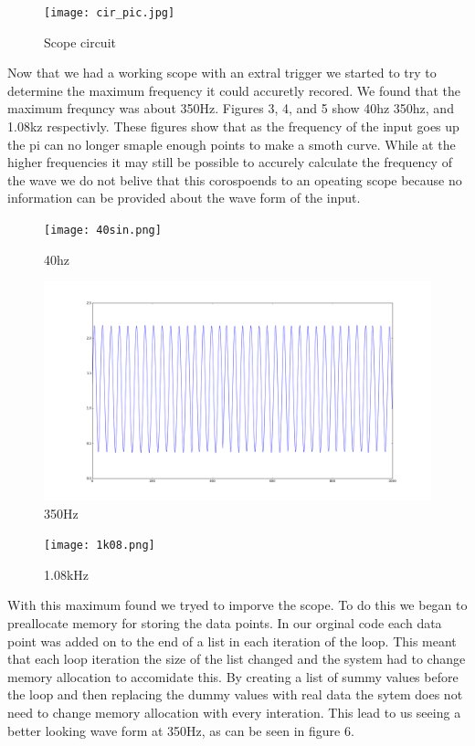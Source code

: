 \documentclass[prl,12pt,notitlepage,aps,onecolumn,superscriptaddress]{revtex4-1}
\begin{document}
\begin{figure}[h]
\begin{center}
\texttt{[image: cir\_pic.jpg]}
\end{center}
\caption{\label{fig:pic} Scope circuit}
\end{figure}

Now that we had a working scope with an extral trigger we started to try to determine the maximum frequency it could accuretly recored. We found that the maximum frequncy was about 350Hz. Figures 3, 4, and 5 show 40hz 350hz, and 1.08kz respectivly. These figures show that as the frequency of the input goes up the pi can no longer smaple enough points to make a smoth curve. While at the higher frequencies it may still be possible to accurely calculate the frequency of the wave we do not belive that this corospoends to an opeating scope because no information can be provided about the wave form of the input.

\begin{figure}[h]
\begin{center}
\texttt{[image: 40sin.png]}
\end{center}
\caption{\label{fig:pic} 40hz}
\end{figure}

\begin{figure}[h]
\begin{center}
\includegraphics[width=.5\columnwidth]{350_max_freq.png}
\end{center}
\caption{\label{fig:pic} 350Hz}
\end{figure}

\begin{figure}[h]
\begin{center}
\texttt{[image: 1k08.png]}
\end{center}
\caption{\label{fig:pic} 1.08kHz}
\end{figure}

With this maximum found we tryed to imporve the scope. To do this we began to preallocate memory for storing the data points. In our orginal code each data point was added on to the end of a list in each iteration of the loop. This meant that each loop iteration the size of the list changed and the system had to change memory allocation to accomidate this. By creating a list of summy values before the loop and then replacing the dummy values with real data the sytem does not need to change memory allocation with every interation. This lead to us seeing a better looking wave form at 350Hz, as can be seen in figure 6.
\end{document}
